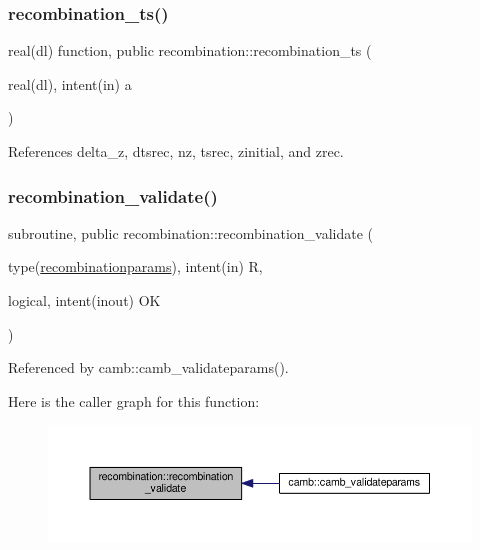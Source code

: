 \subsubsection{\texorpdfstring{recombination\+\_\+ts()}{recombination\_ts()}}
{\footnotesize\ttfamily real(dl) function, public recombination\+::recombination\+\_\+ts (\begin{DoxyParamCaption}\item[{real(dl), intent(in)}]{a }\end{DoxyParamCaption})}



References delta\+\_\+z, dtsrec, nz, tsrec, zinitial, and zrec.

\mbox{\label{namespacerecombination_aaaea2371b700336e16f08b64b6dd44d9}} 
\subsubsection{\texorpdfstring{recombination\+\_\+validate()}{recombination\_validate()}}
{\footnotesize\ttfamily subroutine, public recombination\+::recombination\+\_\+validate (\begin{DoxyParamCaption}\item[{type(\mbox{\hyperlink{structrecombination_1_1recombinationparams}{recombinationparams}}), intent(in)}]{R,  }\item[{logical, intent(inout)}]{OK }\end{DoxyParamCaption})}



Referenced by camb\+::camb\+\_\+validateparams().

Here is the caller graph for this function\+:
\nopagebreak
\begin{figure}[H]
\begin{center}
\leavevmode
\includegraphics[width=350pt]{namespacerecombination_aaaea2371b700336e16f08b64b6dd44d9_icgraph}
\end{center}
\end{figure}
\mbox{\label{namespacerecombination_a64de24be26a98919cba0095322731263}} 
